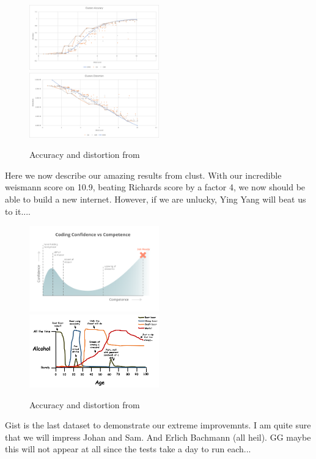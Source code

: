 \begin{figure}[h]
\includegraphics[width=0.5\textwidth]{figures/graphs/clusters_accuracy}
\includegraphics[width=0.5\textwidth]{figures/graphs/clusters_distortion}
\caption{Accuracy and distortion from \clust{}}
\label{fig:graph clust}
\end{figure}
Here we now describe our amazing results from clust. With our incredible weismann score on 10.9, beating Richards score by a factor 4, we now should be able to build a new internet. However, if we are unlucky, Ying Yang will beat us to it....
\clearpage{}

\begin{figure}[h]
\includegraphics[width=0.5\textwidth]{figures/coding_graph}
\includegraphics[width=0.5\textwidth]{figures/alcohol_graph}
\caption{Accuracy and distortion from \gist{}}
\label{fig:graph gist}
\end{figure}
Gist is the last dataset to demonstrate our extreme improvemnts. I am quite sure that we will impress Johan and Sam. And Erlich Bachmann (all heil). GG maybe this will not appear at all since the tests take a day to run each...

